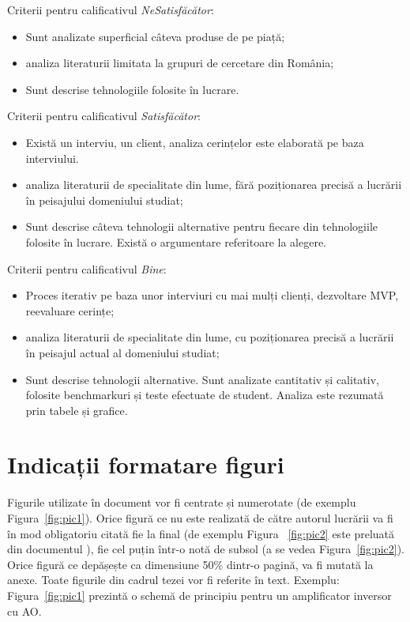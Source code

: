 \documentclass[12pt,a4paper]{report}
\newcommand{\worktype}[1]{[\textit{#1}] }
\newcommand{\dezvoltare}{\worktype{Dezvoltare de produs}}
\newcommand{\cercetare}{\worktype{Cercetare}}
\newcommand{\ambele}{\worktype{Ambele}}
\begin{document}
Criterii pentru calificativul \textit{Ne\textit{Satisfăcător}}:
\begin{itemize}
    \item \dezvoltare Sunt analizate superficial câteva produse de pe piață;
    \item \cercetare analiza literaturii limitata la grupuri de cercetare din România;
    \item \ambele Sunt descrise tehnologiile folosite în lucrare.
\end{itemize}

Criterii pentru calificativul \textit{Satisfăcător}:
\begin{itemize}
    \item \dezvoltare Există un interviu, un client, analiza cerințelor este elaborată pe baza interviului.
    \item \cercetare analiza literaturii de specialitate din lume, fără poziționarea precisă a lucrării în peisajului domeniului studiat;
    \item \ambele Sunt descrise câteva tehnologii alternative pentru fiecare din tehnologiile folosite în lucrare. Există o argumentare referitoare la alegere.
\end{itemize}

Criterii pentru calificativul \textit{Bine}:
\begin{itemize}
    \item \dezvoltare Proces iterativ pe baza unor interviuri cu mai mulți clienți, dezvoltare MVP, reevaluare cerințe;
    \item \cercetare analiza literaturii de specialitate din lume, cu poziționarea precisă a lucrării în peisajul actual al domeniului studiat;
    \item \ambele Sunt descrise tehnologii alternative. Sunt analizate cantitativ și calitativ, folosite benchmarkuri și teste efectuate de student. Analiza este rezumată prin tabele și grafice.
\end{itemize}

\section{Indicații formatare figuri}

Figurile utilizate în document vor fi centrate și numerotate (de exemplu Figura~\ref{fig:pic1}).
Orice figură ce nu este realizată de către autorul lucrării va fi în mod obligatoriu citată fie la final (de exemplu Figura ~\ref{fig:pic2} este preluată din documentul \cite{}), fie cel puțin într-o notă de subsol (a se vedea Figura~\ref{fig:pic2}). Orice figură ce depășește ca dimensiune 50\% dintr-o pagină, va fi mutată la anexe. Toate figurile din cadrul tezei vor fi referite în text. Exemplu: Figura~\ref{fig:pic1} prezintă o schemă de principiu pentru un amplificator inversor cu AO.
\end{document}

